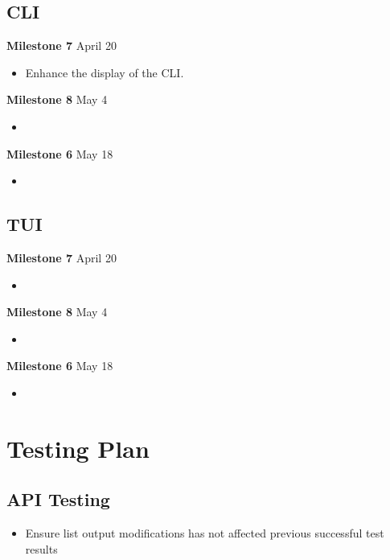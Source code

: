 \documentclass[11pt]{article}
\begin{document}
\subsection*{CLI}
\textbf{Milestone 7} April 20
\begin{itemize}
  \item Enhance the display of the CLI. 
\end{itemize}
\textbf{Milestone 8} May 4
\begin{itemize}
  \item
\end{itemize}
\textbf{Milestone 6} May 18
\begin{itemize}
  \item
\end{itemize}

\subsection*{TUI}
\textbf{Milestone 7} April 20
\begin{itemize}
  \item
\end{itemize}
\textbf{Milestone 8} May 4
\begin{itemize}
  \item
\end{itemize}
\textbf{Milestone 6} May 18
\begin{itemize}
  \item
\end{itemize}

\section*{Testing Plan}

\subsection*{API Testing}
\begin{itemize}
  \item Ensure list output modifications has not affected previous 
    successful test results
\end{itemize}
\end{document}
